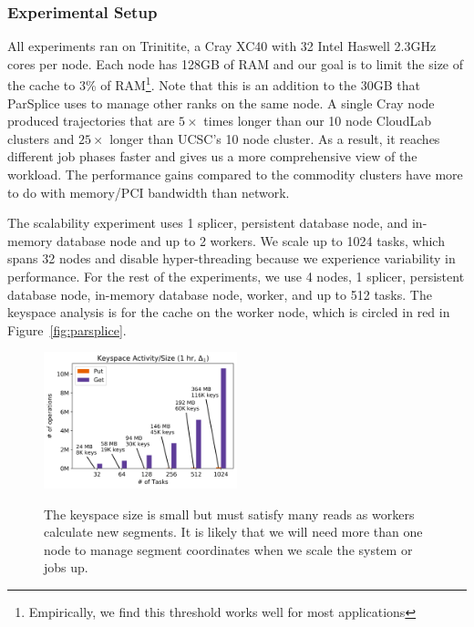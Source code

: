 \subsubsection*{Experimental Setup} All experiments ran on Trinitite, a Cray
XC40 with 32 Intel Haswell 2.3GHz cores per node.  Each node has 128GB of RAM
and our goal is to limit the size of the cache to 3\% of
RAM\footnote{Empirically, we find this threshold works well for most
applications}. Note that this is an addition to the 30GB that ParSplice uses to
manage other ranks on the same node.  A single Cray node produced trajectories
that are \(5\times\) times longer than our 10 node CloudLab clusters and
\(25\times\) longer than UCSC's 10 node cluster. As a result, it reaches
different job phases faster and gives us a more comprehensive view of the
workload. The performance gains compared to the commodity clusters have more to
do with memory/PCI bandwidth than network.

The scalability experiment uses 1 splicer, persistent database node, and
in-memory database node and up to 2 workers. We scale up to 1024 tasks, which
spans 32 nodes and disable hyper-threading because we experience variability in
performance. For the rest of the experiments, we use 4 nodes, 1 splicer,
persistent database node, in-memory database node, worker, and up to 512 tasks.
The keyspace analysis is for the cache on the worker node, which is circled in
red in Figure~\ref{fig:parsplice}.

\begin{figure}[t]
  \noindent\includegraphics[width=0.5\textwidth]{figures/methodology-keyspace.png}\\
  \caption{The keyspace size is small but must satisfy many reads as workers
  calculate new segments. It is likely that we will need
  more than one node to manage segment coordinates when we scale the system or jobs up.
  \label{fig:methodology-keyspace}}
\end{figure}

